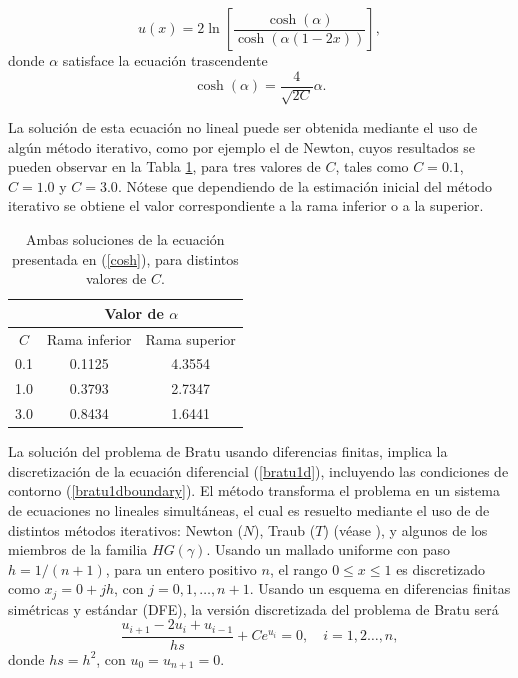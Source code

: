 \begin{equation}\label{exact}
u(x)=2\ln{\left[\frac{\cosh{(\alpha)}}{\cosh{(\alpha(1-2x))}}\right]},
\end{equation}
donde $\alpha$ satisface la ecuación trascendente
\begin{equation}\label{cosh}
\cosh{(\alpha)}=\frac{4}{\sqrt{2C}} \alpha.
\end{equation}

La solución de esta ecuación no lineal puede ser obtenida mediante el uso de algún método iterativo, como por ejemplo el de Newton, cuyos resultados se pueden observar en la Tabla \ref{alphas}, para tres valores de $C$, tales como $C=0.1$, $C=1.0$ y $C=3.0$.
Nótese que dependiendo de la estimación inicial del método iterativo se obtiene el valor correspondiente a la rama inferior o a la superior.

\begin{table}[h!]\centering
	\begin{tabular}{c|c|c|}
		\cline{2-3}
		\multicolumn{1}{l|}{}       & \multicolumn{2}{c|}{Valor de $\alpha$} \\ \hline
		\multicolumn{1}{|c|}{$C$}   & Rama inferior     & Rama superior     \\ \hline
		\multicolumn{1}{|c|}{0.1}   & 0.1125               & 4.3554               \\ \hline
		\multicolumn{1}{|c|}{1.0}   & 0.3793               & 2.7347               \\ \hline
		\multicolumn{1}{|c|}{3.0}   & 0.8434               & 1.6441               \\ \hline
	\end{tabular}
	\caption{Ambas soluciones de la ecuación presentada en (\ref{cosh}), para distintos valores de $C$.}\label{alphas}
\end{table}

La solución del problema de Bratu usando diferencias finitas, implica la discretización de la ecuación diferencial (\ref{bratu1d}), incluyendo las condiciones de contorno (\ref{bratu1dboundary}).
El método transforma el problema en un sistema de ecuaciones no lineales simultáneas, el cual es resuelto mediante el uso de de distintos métodos iterativos: Newton ($N$), Traub ($T$) (véase \cite{TR}), y algunos de los miembros de la familia $HG(\gamma)$. Usando un mallado uniforme con paso  $h=1/(n+1)$, para un entero positivo $n$, el rango $0 \leq x \leq 1$ es discretizado como $x_j=0+jh$, con $j=0,1, \ldots,n+1$. Usando un esquema en diferencias finitas simétricas y estándar (DFE), la versión discretizada del problema de Bratu será
\begin{equation} \label{sfd}
\frac{u_{i+1}-2u_i+u_{i-1}}{hs}+Ce^{u_i}=0,  \quad i=1,2 \ldots, n,
\end{equation}
donde $hs=h^2$, con $u_0=u_{n+1}=0$.


